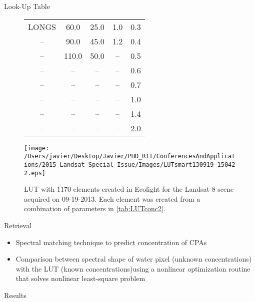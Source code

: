 \documentclass{beamer}
\begin{document}
\begin{frame}{}
\begin{columns}[t]
\begin{column}{.3\linewidth}
\begin{block}{Look-Up Table}
\begin{figure}[htb]
\begin{minipage}[c]{0.44\linewidth}
\begin{table}[htb]
\begin{tabular}{c|c|c|c|c}
LONGS   &  60.0   & 25.0    &  1.0    &  0.3  \\
--      &  90.0   & 45.0    &  1.2    &  0.4  \\
--      &  110.0  & 50.0    &  --     &  0.5  \\
--      &  --     & --      &  --     &  0.6  \\  
--      &  --     & --      &  --     &  0.7  \\  
--      &  --     & --      &  --     &  1.0  \\   
--      &  --     & --      &  --     &  1.4  \\  
--      &  --     & --      &  --     &  2.0  \\  \hline \hline
    \end{tabular}
  \end{table}
  \end{minipage}
  \hfill
  \begin{minipage}[d]{0.54\linewidth}  
    \centering
      \texttt{[image: /Users/javier/Desktop/Javier/PHD\_RIT/ConferencesAndApplications/2015\_Landsat\_Special\_Issue/Images/LUTsmart130919\_150422.eps]}
      \caption{LUT with $1170$ elements created in Ecolight for the Landsat 8 scene acquired on 09-19-2013. Each element was created from a combination of parameters in \autoref{tab:LUTconc2}.}
      \label{fig:LUT}
  \end{minipage}
\end{figure}


\end{block}
\begin{block}{Retrieval}
  \begin{itemize}
    \item Spectral matching technique to predict concentration of CPAs
    \vspace{0.5cm}
    \item Comparison between spectral shape of water pixel (unknown concentrations) with the LUT (known concentrations)using a nonlinear optimization routine that solves nonlinear least-square problem
  \end{itemize}
\end{block}

\begin{block}{Results}


\end{block}
\end{column}
\end{columns}
\end{frame}
\end{document}
